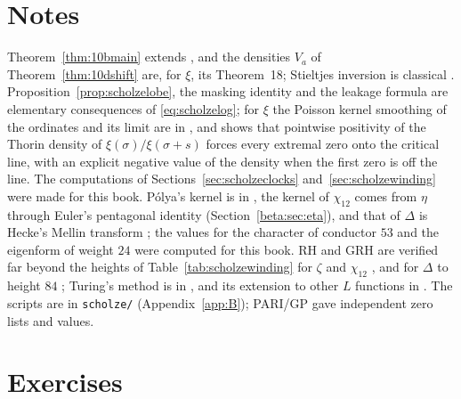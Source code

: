 \section{Notes}

Theorem~\ref{thm:10bmain} extends \cite{polson2018vdp}, and the densities $V_a$ of Theorem~\ref{thm:10dshift} are, for $\xi$, its Theorem~18; Stieltjes inversion is classical \cite{stieltjes1894,akhiezer1965}. Proposition~\ref{prop:scholzelobe}, the masking identity and the leakage formula are elementary consequences of \eqref{eq:scholzelog}; for $\xi$ the Poisson kernel smoothing of the ordinates and its limit are in \cite{polson2018vdp}, and \cite{polson2026thorin} shows that pointwise positivity of the Thorin density of $\xi(\sigma)/\xi(\sigma+s)$ forces every extremal zero onto the critical line, with an explicit negative value of the density when the first zero is off the line. The computations of Sections~\ref{sec:scholzeclocks} and~\ref{sec:scholzewinding} were made for this book. P\'olya's kernel is in \cite{polya1926}, the kernel of $\chi_{12}$ comes from $\eta$ through Euler's pentagonal identity (Section~\ref{beta:sec:eta}), and that of $\Delta$ is Hecke's Mellin transform \cite{hecke1936}; the values for the character of conductor $53$ and the eigenform of weight $24$ were computed for this book. RH and GRH are verified far beyond the heights of Table~\ref{tab:scholzewinding} for $\zeta$ and $\chi_{12}$ \cite{platttrudgian2021,platt2016}, and for $\Delta$ to height $84$ \cite{hik2027}; Turing's method is in \cite{turing1953}, and its extension to other $L$ functions in \cite{booker2006}. The scripts are in \texttt{scholze/} (Appendix~\ref{app:B}); PARI/GP \cite{pari2023} gave independent zero lists and values.

\section{Exercises}

